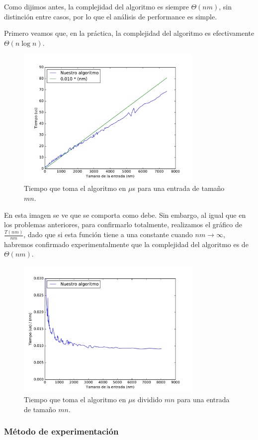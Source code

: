 

Como dijimos antes, la complejidad del algoritmo es siempre $\Theta(n m)$, sin distinción entre casos, por lo que el análisis de performance es simple.

Primero veamos que, en la práctica, la complejidad del algoritmo es efectivamente $\Theta(n \log n)$.

\begin{figure}[H]
 \centering
	\includegraphics[width=0.8\textwidth]{img/exp/problema3-promedio.pdf}
	\caption{\footnotesize Tiempo que toma el algoritmo en $\mu$s para una entrada de tamaño $mn$.}
	\label{fig:problema3-promedio}
\end{figure}

En esta imagen se ve que se comporta como debe. Sin embargo, al igual que en los problemas anteriores, para confirmarlo totalmente, realizamos el gráfico de $\frac{T(nm)}{nm}$, dado que si esta función tiene a una constante cuando $nm \to \infty$, habremos confirmado experimentalmente que la complejidad del algoritmo es de $\Theta(n m)$.

\begin{figure}[H]
 \centering
	\includegraphics[width=0.8\textwidth]{img/exp/problema3-promedio2.pdf}
	\caption{\footnotesize Tiempo que toma el algoritmo en $\mu$s dividido $mn$ para una entrada de tamaño $mn$.}
	\label{fig:problema3-promedio2}
\end{figure}


\subsubsection{M\'etodo de experimentación}
